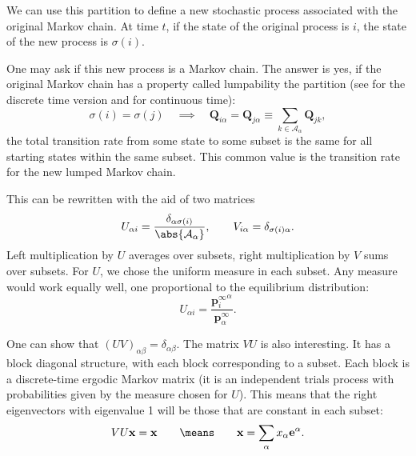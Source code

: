\documentclass{article} %
\newcommand{\onev}{\mathbf{e}}
\newcommand{\MM}{\mathbf{Q}}
\newcommand{\pr}{\mathbf{p}}
\newcommand{\eq}{\pr^\infty}
\newcommand{\CA}{\mathcal{A}}
\begin{document}
We can use this partition to define a new stochastic process associated with the original Markov chain.
At time $t$, if the state of the original process is $i$, the state of the new process is $\sigma(i)$.

One may ask if this new process is a Markov chain.
The answer is yes, if the original Markov chain has a property called lumpability \wrt the partition
(see \cite[\S6.3]{kemeny1960finite} for the discrete time version and \cite{burke1958markovian,Ball1993Lumpability} for continuous time):
%
\begin{equation}\label{eq:lump}
  \sigma(i)=\sigma(j)
  \quad\implies \quad
  \MM_{i\alpha}=\MM_{j\alpha} \equiv \sum_{k\in\CA_\alpha} \MM_{jk},
\end{equation}
%
\ie the total transition rate from some state to some subset is the same for all starting states within the same subset.
This common value is the transition rate for the new lumped Markov chain.

This can be rewritten with the aid of two matrices
%
\begin{equation}\label{eq:lumpmats}
  U_{\alpha i} = \frac{\delta_{\alpha\sigma(i)}}{\abs{\CA_\alpha}},
  \qquad
  V_{i\alpha} = \delta_{\sigma(i)\alpha}.
\end{equation}
%
Left multiplication by $U$ averages over subsets, right multiplication by $V$ sums over subsets.
For $U$, we chose the uniform measure in each subset. Any measure would work equally well, \eg one proportional to the equilibrium distribution:
%
\begin{equation}\label{eq:altlumpmats}
  U_{\alpha i} = \frac{{\eq_i}^\alpha}{\eq_\alpha}.
\end{equation}
%

One can show that $(UV)_{\alpha\beta}=\delta_{\alpha\beta}$.
The matrix $VU$ is also interesting.
It has a block diagonal structure, with each block corresponding to a subset.
Each block is a discrete-time ergodic Markov matrix (it is an independent trials process with probabilities given by the measure chosen for $U$).
This means that the right eigenvectors with eigenvalue 1 will be those that are constant in each subset:
%
\begin{equation}\label{eq:setconst}
  VU\mathbf{x}=\mathbf{x}
  \qquad\means\qquad
  \mathbf{x} = \sum_\alpha x_\alpha \onev^\alpha.
\end{equation}
%
\end{document}
